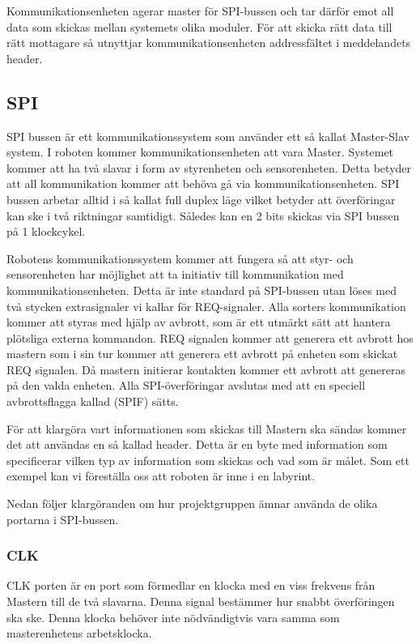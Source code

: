 Kommunikationsenheten agerar master för SPI-bussen och tar därför emot all data
som skickas mellan systemets olika moduler. För att skicka rätt data till rätt
mottagare så utnyttjar kommunikationsenheten addressfältet i meddelandets
header.

\subsection{SPI}
SPI bussen är ett kommunikationssystem som använder ett så kallat Master-Slav system. I roboten kommer kommunikationsenheten att vara Master. Systemet kommer att ha två slavar i form av styrenheten och sensorenheten.
Detta betyder att all kommunikation kommer att behöva gå via kommunikationsenheten. SPI bussen arbetar alltid i så kallat full duplex läge vilket betyder att överföringar kan ske i två riktningar samtidigt. Således kan en 2 bits skickas via SPI bussen på 1 klockcykel. 

Robotens kommunikationssystem kommer att fungera så att styr- och sensorenheten har möjlighet att ta initiativ till kommunikation med kommunikationsenheten. Detta är inte standard på SPI-bussen utan löses med två stycken extrasignaler vi kallar för REQ-signaler. Alla sorters kommunikation kommer att styras med hjälp av avbrott, som är ett utmärkt sätt att hantera plötsliga externa kommandon. REQ signalen kommer att generera ett avbrott hos mastern som i sin tur kommer att generera ett avbrott på enheten som skickat REQ signalen. Då mastern initierar kontakten kommer ett avbrott att genereras på den valda enheten. Alla SPI-överföringar avslutas med att en speciell avbrottsflagga kallad (SPIF) sätts.

För att klargöra vart informationen som skickas till Mastern ska sändas kommer det att användas en så kallad header. Detta är en byte med information som specificerar vilken typ av information som skickas och vad som är målet. Som ett exempel kan vi föreställa oss att roboten är inne i en labyrint. 

Nedan följer klargöranden om hur projektgruppen ämnar använda de olika portarna i SPI-bussen. 


\subsubsection{CLK}

CLK porten är en port som förmedlar en klocka med en viss frekvens från Mastern till de två slavarna. Denna signal bestämmer hur snabbt överföringen ska ske. Denna klocka behöver inte nödvändigtvis vara samma som masterenhetens arbetsklocka. 

